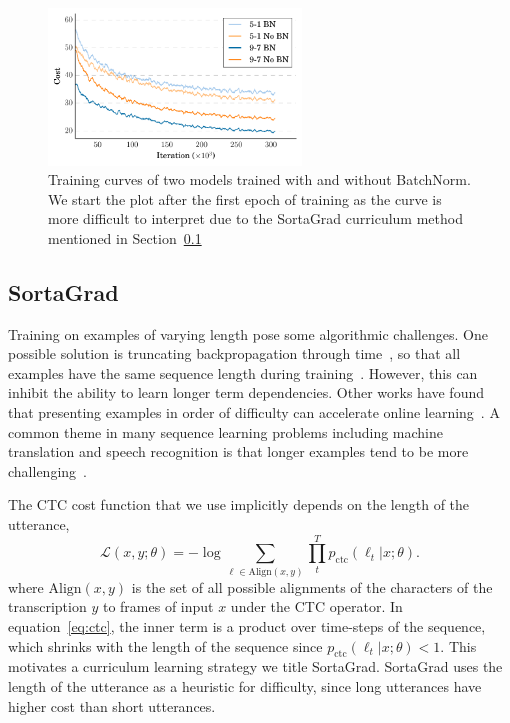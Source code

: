 \documentclass{article}
\begin{document}
\begin{figure}
\centering
\includegraphics[width=0.6\textwidth]{n_bn_nobn.pdf}
\caption{Training curves of two models trained with and without BatchNorm. We start the plot after the first epoch of training as the curve is more difficult to interpret due to the SortaGrad curriculum method mentioned in Section~\ref{subsection:sorting}}
\label{fig:bn}
\end{figure}


\subsection{SortaGrad}
\label{subsection:sorting}

Training on examples of varying length pose some algorithmic challenges. One possible solution is truncating backpropagation through time~\cite{williams1990}, so that all examples have the same sequence length during training~\cite{sainath2015}. However, this can inhibit the ability to learn longer term dependencies. Other works have found that presenting examples in order of difficulty can accelerate online learning~\cite{bengio2009curriculum, zaremba2014}. A common theme in many sequence learning problems including machine translation and speech recognition is that longer examples tend to be more challenging~\cite{cho2014}.

The CTC cost function that we use implicitly depends on the length of the utterance,
\begin{equation}
\label{eq:ctc}
    \mathcal{L}(x, y; \theta) = -\log \sum_{\ell \in \textrm{Align}(x, y)} \prod_t^{T} p_{\textrm{ctc}}(\ell_t | x; \theta).
\end{equation}
where $\textrm{Align}(x, y)$ is the set of all possible alignments of the characters of the transcription $y$ to frames of input $x$ under the CTC operator. In equation~\ref{eq:ctc}, the inner term is a product over time-steps of the sequence, which shrinks with the length of the sequence since $p_{\textrm{ctc}}(\ell_t|x;\theta)<1$. This motivates a curriculum learning strategy we title SortaGrad. SortaGrad uses the length of the utterance as a heuristic for difficulty, since long utterances have higher cost than short utterances.
\end{document}
